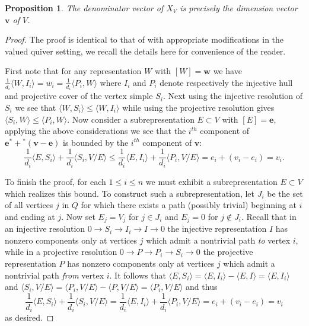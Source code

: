 \documentclass[12pt]{amsart}
\newtheorem{proposition}[theorem]{Proposition}
\newcommand{\bfe}{\mathbf{e}}
\newcommand{\bfv}{\mathbf{v}}
\newcommand{\bfw}{\mathbf{w}}
\begin{document}
   \begin{proposition}
    \label{prop:denominators}
    The denominator vector of $X_V$ is precisely the dimension vector $\bfv$ of $V$.
  \end{proposition}
  \begin{proof}
    The proof is identical to that of \cite[Sec. 4, Cor. 2]{caldero-keller} with appropriate modifications in the valued quiver setting, we recall the details here for convenience of the reader.  

    First note that for any representation $W$ with $[W]=\bfw$ we have $\frac{1}{d_i}\langle W,I_i\rangle=w_i=\frac{1}{d_i}\langle P_i,W\rangle$ where $I_i$ and $P_i$ denote respectively the injective hull and projective cover of the vertex simple $S_i$.  Next using the injective resolution of $S_i$ we see that $\langle W,S_i\rangle\le\langle W,I_i\rangle$ while using the projective resolution gives $\langle S_i,W\rangle\le\langle P_i,W\rangle$.  Now consider a subrepresentation $E\subset V$ with $[E]=\bfe$, applying the above considerations we see that the $i^{th}$ component of $\bfe^*+{}^*(\bfv-\bfe)$ is bounded by the $i^{th}$ component of $\bfv$:
    \[\frac{1}{d_i}\langle E,S_i\rangle+\frac{1}{d_i}\langle S_i,V/E\rangle\le\frac{1}{d_i}\langle E,I_i\rangle+\frac{1}{d_i}\langle P_i,V/E\rangle=e_i+(v_i-e_i)=v_i.\]

    To finish the proof, for each $1\le i\le n$ we must exhibit a subrepresentation $E\subset V$ which realizes this bound.  
    To construct such a subrepresentation, let $J_i$ be the set of all vertices $j$ in $Q$ for which there exists a path (possibly trivial) beginning at $i$ and ending at $j$.  
    Now set $E_j=V_j$ for $j\in J_i$ and $E_j=0$ for $j\notin J_i$.  
    Recall that in an injective resolution $0\longrightarrow S_i\longrightarrow I_i\longrightarrow I\longrightarrow 0$ the injective representation $I$ has nonzero components only at vertices $j$ which admit a nontrivial path \emph{to} vertex $i$, while in a projective resolution $0\longrightarrow P\longrightarrow P_i\longrightarrow S_i\longrightarrow 0$ the projective representation $P$ has nonzero components only at vertices $j$ which admit a nontrivial path \emph{from} vertex $i$.  
    It follows that $\langle E,S_i\rangle=\langle E,I_i\rangle-\langle E,I\rangle=\langle E,I_i\rangle$ and $\langle S_i,V/E\rangle=\langle P_i,V/E\rangle-\langle P,V/E\rangle=\langle P_i,V/E\rangle$ and thus 
    \[\frac{1}{d_i}\langle E,S_i\rangle+\frac{1}{d_i}\langle S_i,V/E\rangle=\frac{1}{d_i}\langle E,I_i\rangle+\frac{1}{d_i}\langle P_i,V/E\rangle=e_i+(v_i-e_i)=v_i\]
    as desired.
  \end{proof}
\end{document}
